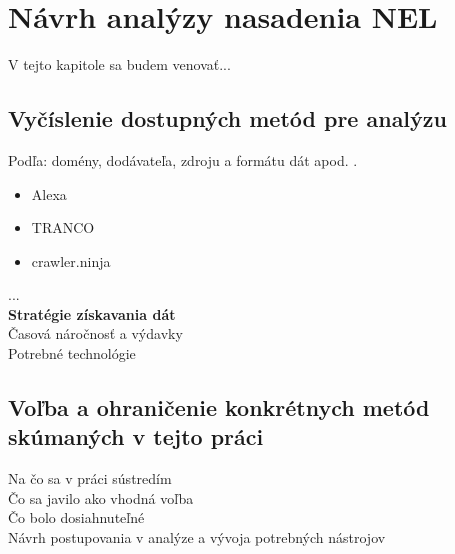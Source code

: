 \chapter{Návrh analýzy nasadenia NEL}
\label{possible-analysis-strategies}

V tejto kapitole sa budem venovať...


\section{Vyčíslenie dostupných metód pre analýzu}

Podľa: domény, dodávateľa, zdroju a formátu dát apod. \cite{automatic-js-restrictor-testing}.
\begin{itemize}
\item Alexa
\item TRANCO
\item crawler.ninja
\end{itemize}

...
\\
\textbf{Stratégie získavania dát}
\\
Časová náročnosť a výdavky
\\
Potrebné technológie

\section{Voľba a ohraničenie konkrétnych metód skúmaných v tejto práci}

Na čo sa v práci sústredím
\\
Čo sa javilo ako vhodná voľba
\\
Čo bolo dosiahnuteľné
\\
Návrh postupovania v analýze a vývoja potrebných nástrojov
